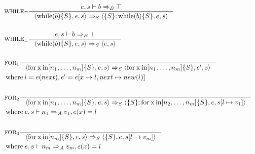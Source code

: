 \begin{align*}
&\inference[$\text{WHILE}_\top$]{e,s \vdash b \Rightarrow_B \top}
                       {\Braket{\Twhile(b)\{S\},e,s} \Rightarrow_S \Braket{\{S\}; \Twhile (b)\{S\},e,s}}
\\\\
&\inference[$\text{WHILE}_\bot$]{e,s \vdash b \Rightarrow_B \bot}
                       {\Braket{\Twhile(b)\{S\},e,s} \Rightarrow_S \Braket{e,s}}
\\\\
&\inference[$\text{FOR}_1$]{}
                       {\Braket{\Tfor \Tx \Tin [n_1,\dots,n_m]\{S\},e,s} \Rightarrow_S \Braket{\Tfor \mathbin{\text{x}} \mathbin{\text{in}} [n_1,\dots,n_m]\{S\},e',s}}
\\
&\mathbin{\text{where}} l = e(next), e' = e[x\mapsto l,next\mapsto new(l)]
\\\\
&\inference[$\text{FOR}_2$]{}
                       {\Braket{\Tfor \Tx \Tin [n_1,\dots,n_m]\{S\},e,s} \Rightarrow_S \Braket{\{S\}; \Tfor \mathbin{\text{x}} \mathbin{\text{in}} [n_2,\dots,n_m]\{S\},e,s[l\mapsto v_1]}}
\\
&\mathbin{\text{where}} e,s \vdash n_1 \Rightarrow_A v_1,e(x)=l
\\\\
&\inference[$\text{FOR}_3$]{}
                       {\Braket{\Tfor \mathbin{\text{x}} \mathbin{\text{in}} [n_m]\{S\},e,s} \Rightarrow_S \Braket{\{S\},e,s[l\mapsto v_m]}}
\\
&\mathbin{\text{where}} e,s \vdash n_m \Rightarrow_A v_m,e(x)=l
\end{align*}